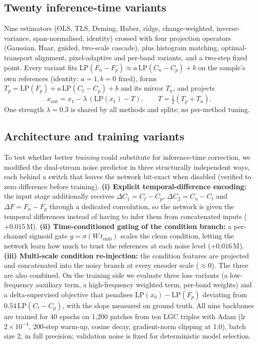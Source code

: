 \documentclass{article}
\begin{document}
\subsection{Twenty inference-time variants}
Nine estimators (OLS, TLS, Deming, Huber, ridge, change-weighted, inverse-variance, span-normalised, identity) crossed with four projection operators (Gaussian, Haar, guided, two-scale cascade), plus histogram matching, optimal-transport alignment, pixel-adaptive and per-band variants, and a two-step fixed point. Every variant fits $\mathrm{LP}(F_n{-}F_p)\approx a\,\mathrm{LP}(C_n{-}C_p)+b$ on the sample's own references (identity: $a{=}1,b{=}0$ fixed), forms $T_p=\mathrm{LP}(F_p)+a\,\mathrm{LP}(C_t{-}C_p)+b$ and its mirror $T_n$, and projects
\begin{equation}
x_{\mathrm{out}}=x_1-\lambda\,(\mathrm{LP}(x_1)-T),\qquad T=\tfrac12(T_p+T_n).
\label{eq:proj}
\end{equation}
One strength $\lambda{=}0.3$ is shared by all methods and splits; no per-method tuning.

\subsection{Architecture and training variants}
\label{sec:arch}
To test whether better \emph{training} could substitute for inference-time correction, we modified the dual-stream noise predictor in three structurally independent ways, each behind a switch that leaves the network bit-exact when disabled (verified to zero difference before training). \textbf{(i) Explicit temporal-difference encoding:} the input stage additionally receives $\Delta C_1=C_t-C_p$, $\Delta C_2=C_n-C_t$ and $\Delta F=F_n-F_p$ through a dedicated convolution, so the network is given the temporal differences instead of having to infer them from concatenated inputs ($+0.015$\,M). \textbf{(ii) Time-conditioned gating of the condition branch:} a per-channel sigmoid gate $g=\sigma(W\,t_{\mathrm{emb}})$ scales the clean condition, letting the network learn how much to trust the references at each noise level ($+0.016$\,M). \textbf{(iii) Multi-scale condition re-injection:} the condition features are projected and concatenated into the noisy branch at every encoder scale ($\approx0$). The three are also combined. On the training side we evaluate three loss variants (a low-frequency auxiliary term, a high-frequency weighted term, per-band weights) and a delta-supervised objective that penalises $\mathrm{LP}(x_0)-\mathrm{LP}(F_p)$ deviating from $0.54\,\mathrm{LP}(C_t-C_p)$, with the slope measured on ground truth. All nine backbones are trained for 40 epochs on 1{,}200 patches from ten LGC triples with Adam (lr $2\times10^{-4}$, 200-step warm-up, cosine decay, gradient-norm clipping at 1.0), batch size 2, in full precision; validation noise is fixed for deterministic model selection.
\end{document}
